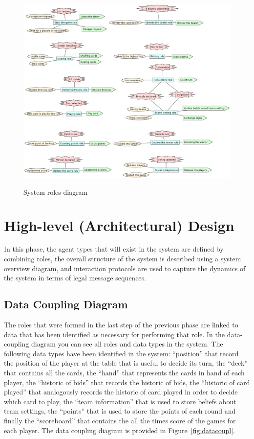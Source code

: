 \documentclass[a4paper]{article}
\begin{document}
\begin{figure}[htp]
  \includegraphics[keepaspectratio,scale=0.4]{pdt/images/system_specification/system_roles.png}
  \label{fig:sysroles}
  \caption{System roles diagram}
\end{figure}

\section{High-level (Architectural) Design}\label{sec:highdesign}

In this phase, the agent types that will exist in the system are defined by combining roles, the overall structure of the system is described using a system overview diagram, and interaction protocols are used to capture the dynamics of the system in terms of legal message sequences.

\subsection{Data Coupling Diagram}

The roles that were formed in the last step of the previous phase are linked to data that has been identified as necessary for performing that role. In the data-coupling diagram you can see all roles and data types in the system. The following data types have been identified in the system: ``position'' that record the position of the player at the table that is useful to decide its turn, the ``deck'' that contains all the cards, the ``hand'' that represents the cards in hand of each player, the ``historic of bids'' that records the historic of bids, the ``historic of card played'' that analogously records the historic of card played in order to decide which card to play, the ``team information'' that is used to store beliefs about team settings, the ``points'' that is used to store the points of each round and finally the ``scoreboard'' that contains the all the times score of the games for each player. The data coupling diagram is provided in Figure~\ref{fig:datacoupl}.
\end{document}

